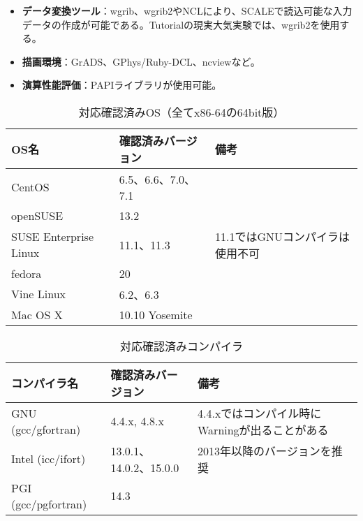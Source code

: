 \begin{itemize}
  \item {\bf データ変換ツール}：wgrib、wgrib2やNCLにより、SCALEで読込可能な入力データの作成が可能である。Tutorialの現実大気実験では、wgrib2を使用する。
  \item {\bf 描画環境}：GrADS、GPhys/Ruby-DCL、ncviewなど。
  \item {\bf 演算性能評価}：PAPIライブラリが使用可能。
\end{itemize}


\begin{table}[htb]
\begin{center}
\caption{対応確認済みOS（全てx86-64の64bit版）}
\begin{tabularx}{150mm}{|l|l|X|} \hline
 \rowcolor[gray]{0.9} OS名 & 確認済みバージョン & 備考 \\ \hline
 CentOS                & 6.5、6.6、7.0、7.1 &  \\ \hline
 openSUSE              & 13.2               &  \\ \hline
 SUSE Enterprise Linux & 11.1、11.3         & 11.1ではGNUコンパイラは使用不可 \\ \hline
 fedora                & 20                 &  \\ \hline
 Vine Linux            & 6.2、6.3           &  \\ \hline
 Mac OS X              & 10.10 Yosemite     &  \\ \hline
\end{tabularx}
\label{tab:compatible_os}
\end{center}
\end{table}

\begin{table}[htb]
\begin{center}
\caption{対応確認済みコンパイラ}
\begin{tabularx}{150mm}{|l|l|X|} \hline
 \rowcolor[gray]{0.9} コンパイラ名 & 確認済みバージョン & 備考 \\ \hline
 GNU (gcc/gfortran)    & 4.4.x, 4.8.x           & 4.4.xではコンパイル時にWarningが出ることがある \\ \hline
 Intel (icc/ifort)     & 13.0.1、14.0.2、15.0.0 & 2013年以降のバージョンを推奨 \\ \hline
 PGI (gcc/pgfortran)   & 14.3                   &  \\ \hline
\end{tabularx}
\label{tab:compatible_compiler}
\end{center}
\end{table}


